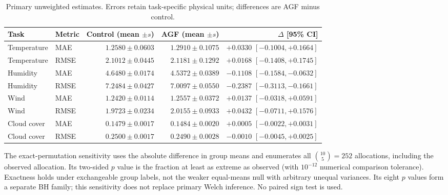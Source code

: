 \documentclass[10pt,a4paper]{article}
\begin{document}
\begin{table}[H]\centering\small\setlength{\tabcolsep}{5pt}\setlength{\parskip}{0pt}

\caption{Primary unweighted estimates. Errors retain task-specific physical units; differences are AGF minus control.}\label{tab:primary_estimates}

\begin{tabular}{llrrr}

\toprule
Task & Metric & Control (mean $\pm s$) & AGF (mean $\pm s$) & $\Delta$ [95\% CI] \\
\midrule

Temperature & MAE & $1.2580 \pm 0.0603$ & $1.2910 \pm 0.1075$ & $+0.0330$ $[-0.1004, +0.1664]$ \\

Temperature & RMSE & $2.1012 \pm 0.0445$ & $2.1181 \pm 0.1292$ & $+0.0168$ $[-0.1408, +0.1745]$ \\

Humidity & MAE & $4.6480 \pm 0.0174$ & $4.5372 \pm 0.0389$ & $-0.1108$ $[-0.1584, -0.0632]$ \\

Humidity & RMSE & $7.2484 \pm 0.0427$ & $7.0097 \pm 0.0550$ & $-0.2387$ $[-0.3113, -0.1661]$ \\

Wind & MAE & $1.2420 \pm 0.0114$ & $1.2557 \pm 0.0372$ & $+0.0137$ $[-0.0318, +0.0591]$ \\

Wind & RMSE & $1.9723 \pm 0.0234$ & $2.0155 \pm 0.0933$ & $+0.0432$ $[-0.0711, +0.1576]$ \\

Cloud cover & MAE & $0.1479 \pm 0.0017$ & $0.1484 \pm 0.0020$ & $+0.0005$ $[-0.0022, +0.0031]$ \\

Cloud cover & RMSE & $0.2500 \pm 0.0017$ & $0.2490 \pm 0.0028$ & $-0.0010$ $[-0.0045, +0.0025]$ \\

\bottomrule\end{tabular}\end{table}

The exact-permutation sensitivity uses the absolute difference in group means and enumerates all $\binom{10}{5}=252$ allocations, including the observed allocation. Its two-sided $p$ value is the fraction at least as extreme as observed (with $10^{-12}$ numerical comparison tolerance). Exactness holds under exchangeable group labels, not the weaker equal-means null with arbitrary unequal variances. Its eight $p$ values form a separate BH family; this sensitivity does not replace primary Welch inference. No paired sign test is used.
\end{document}
